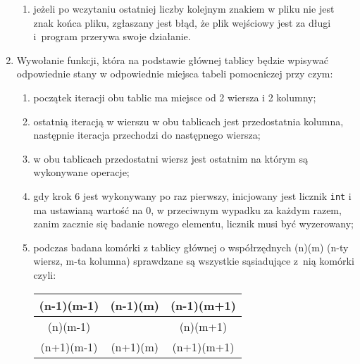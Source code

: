 \documentclass[12pt]{report}
\newcommand{\code}[1]{\texttt{#1}}
\begin{document}
\begin{enumerate}
\begin{enumerate}
    \item jeżeli po wczytaniu ostatniej liczby kolejnym znakiem w pliku nie jest znak końca pliku, zgłaszany jest błąd, że plik wejściowy jest za długi i~program przerywa swoje działanie.
\end{enumerate}
\item Wywołanie funkcji, która na podstawie głównej tablicy będzie wpisywać odpowiednie stany w odpowiednie miejsca tabeli pomocniczej przy czym:
\begin{enumerate}
    \item początek iteracji obu tablic ma miejsce od 2 wiersza i 2 kolumny;
    \item ostatnią iteracją w wierszu w obu tablicach jest przedostatnia kolumna, następnie iteracja przechodzi do następnego wiersza;
    \item w obu tablicach przedostatni wiersz jest ostatnim na którym są wykonywane operacje;
    \item gdy krok 6 jest wykonywany po raz pierwszy, inicjowany jest licznik \code{int} i ma ustawianą wartość na 0, w przeciwnym wypadku za każdym razem, zanim zacznie się badanie nowego elementu, licznik musi być wyzerowany;
    \item podczas badana komórki z tablicy głównej o współrzędnych (n)(m) (n-ty wiersz, m-ta kolumna) sprawdzane są wszystkie sąsiadujące z~nią komórki czyli:
    \begin{center}
    \begin{tabular}{ |c|c|c| } 
    \hline
    (n-1)(m-1) & (n-1)(m) & (n-1)(m+1) \\ 
    \hline
    (n)(m-1) &  & (n)(m+1) \\ 
    \hline
    (n+1)(m-1) & (n+1)(m) & (n+1)(m+1) \\ 
    \hline
    \end{tabular}
    \end{center}


\end{enumerate}
\end{enumerate}
\end{document}
